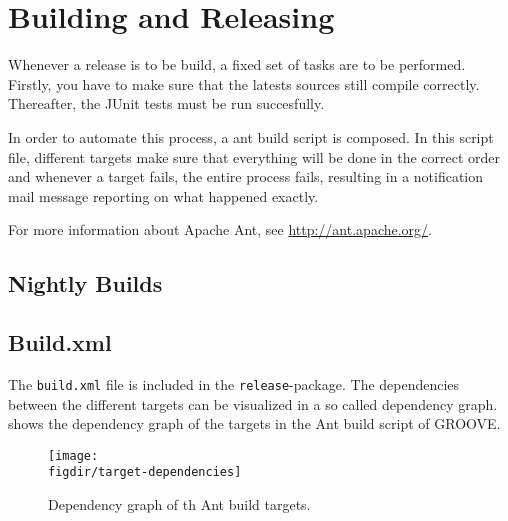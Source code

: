 \chapter{Building and Releasing}

Whenever a release is to be build, a fixed set of tasks are to be performed. Firstly, you have to make sure that the latests sources still compile correctly. Thereafter, the JUnit tests must be run succesfully.

In order to automate this process, a ant build script is composed. In this script file, different targets make sure that everything will be done in the correct order and whenever a target fails, the entire process fails, resulting in a notification mail message reporting on what happened exactly.

For more information about Apache Ant, see \url{http://ant.apache.org/}.

\section{Nightly Builds}

\section{Build.xml}

The {\tt build.xml} file is included in the {\tt release}-package. The dependencies between the different targets can be visualized in a so called dependency graph.  shows the dependency graph of the targets in the Ant build script of GROOVE.

\begin{figure}[htp]
  \centering
  \texttt{[image: \\figdir/target-dependencies]}
  \caption{Dependency graph of th Ant build targets.}
\end{figure}